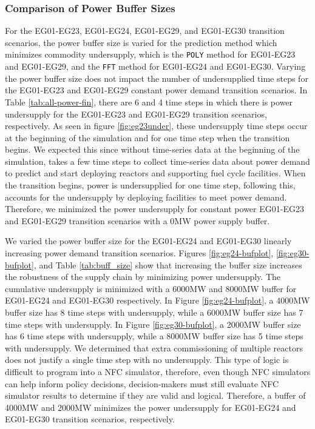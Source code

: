 \subsubsection{Comparison of Power Buffer Sizes}
\label{sec:complex2}
For the EG01-EG23, EG01-EG24, EG01-EG29, and EG01-EG30 transition scenarios, 
the power buffer size is varied for the prediction method which
minimizes commodity undersupply, 
which is the \texttt{POLY} method for EG01-EG23 and EG01-EG29, and the 
\texttt{FFT} method for EG01-EG24 and EG01-EG30. 
Varying the power buffer size does not impact the number of 
undersupplied time steps for the EG01-EG23 and EG01-EG29 constant 
power demand transition scenarios.
In Table \ref{tab:all-power-fin}, there are 6 and 4 time steps
in which there is power undersupply for the EG01-EG23 and EG01-EG29 
transition scenarios, respectively. 
As seen in figure \ref{fig:eg23under}, these undersupply time 
steps occur at the beginning of the simulation and for one 
time step when the transition begins. 
We expected this since without time-series data 
at the beginning of the simulation, \deploy takes a few 
time steps to collect time-series data about power demand 
to predict and start deploying reactors and supporting 
fuel cycle facilities. 
When the transition begins, power is undersupplied for one 
time step, following this, \deploy accounts for the 
undersupply by deploying facilities to meet power demand.
Therefore, we minimized the power undersupply for constant 
power EG01-EG23 and EG01-EG29 transition scenarios with 
a 0MW power supply buffer. 

We varied the power buffer size for the EG01-EG24 and EG01-EG30 
linearly increasing power demand transition scenarios. 
Figures \ref{fig:eg24-bufplot}, \ref{fig:eg30-bufplot}, 
and Table \ref{tab:buff_size} 
show that increasing the buffer size increases the robustness 
of the supply chain by minimizing power undersupply. 
The cumulative undersupply is minimized with a 6000MW and 8000MW 
buffer for EG01-EG24 and EG01-EG30 respectively.
In Figure \ref{fig:eg24-bufplot}, a 4000MW buffer size has 
8 time steps with undersupply, while a 6000MW buffer size has 
7 time steps with undersupply. 
In Figure \ref{fig:eg30-bufplot}, a 2000MW buffer size has 
6 time steps with undersupply, while a 8000MW buffer size has 
5 time steps with undersupply. 
We determined that extra commissioning of multiple reactors does not 
justify a single time step with no undersupply. 
This type of logic is difficult to program into a NFC simulator, 
therefore, even though NFC simulators can help inform policy decisions, 
decision-makers must still evaluate NFC simulator results to determine if 
they are valid and logical. 
Therefore, a buffer of 4000MW and 2000MW minimizes 
the power undersupply for EG01-EG24 and EG01-EG30 transition 
scenarios, respectively.

